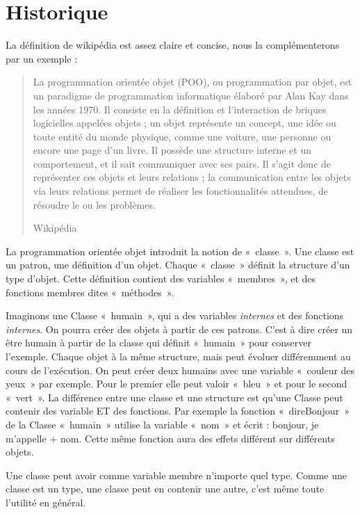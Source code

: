 
  \label{DefPOO}
  \section{Historique}
  	La définition de wikipédia est assez claire et concise, nous la complémenterons par un exemple : 
  	\begin{quotation}
  		La programmation orientée objet (POO), ou programmation par objet, est un paradigme de programmation informatique élaboré par Alan Kay dans les années 1970. Il consiste en la définition et l'interaction de briques logicielles appelées objets ; un objet représente un concept, une idée ou toute entité du monde physique, comme une voiture, une personne ou encore une page d'un livre. Il possède une structure interne et un comportement, et il sait communiquer avec ses pairs. Il s'agit donc de représenter ces objets et leurs relations ; la communication entre les objets via leurs relations permet de réaliser les fonctionnalités attendues, de résoudre le ou les problèmes.
  		\begin{flushright}
  			Wikipédia
  		\end{flushright}
  	\end{quotation}

    La programmation orientée objet introduit la notion de «~classe~». Une classe est 
    un patron, une définition d'un objet. Chaque «~classe~» définit la structure d'un type
    d'objet. Cette définition contient des variables «~membres~», et des fonctions membres dites «~méthodes~».
    
    Imaginons une Classe «~humain~», qui a des variables \textit{internes} et
    des fonctions \textit{internes}. On pourra créer des objets à partir de ces patrons. C'est à dire 
    créer un être humain à partir de la classe qui définit «~humain~» pour conserver l'exemple. Chaque objet 
    à la même structure, mais peut évoluer différemment au cours de l’exécution. On peut créer
    deux humains avec une variable «~couleur des yeux~» par exemple. Pour le premier elle peut valoir «~bleu~» et pour le second «~vert~». La différence entre une classe et une structure est qu'une Classe 
    peut contenir des variable ET des fonctions. Par exemple la fonction «~direBonjour~» de la 
    Classe «~humain~» utilise la variable «~nom~» et écrit : bonjour, je m'appelle + nom.
    Cette même fonction aura des effets différent sur différents objets.
    
    Une classe peut avoir comme variable membre n'importe quel type. Comme une classe est un type, une classe peut en contenir une autre, c'est même toute l'utilité en général.
